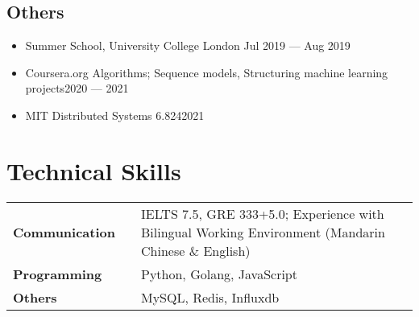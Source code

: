 \documentclass[a4,10pt]{article}
\newcommand{\subtext}[1]{
#1\par\vspace{-0.2cm}}
\newenvironment{zitemize}{
\begin{itemize}\itemsep0pt \parskip0pt \parsep1pt}
{\end{itemize}\vspace{-0.5cm}}
\newcommand{\hskills}[1]{
\textbf{\bfseries #1} }
\begin{document}
\subsection*{Others}
\begin{zitemize}
    \item
        \subtext{Summer School, University College London \hfill Jul 2019 --- Aug 2019}
        \vspace{0.1cm}
    \item
        \subtext{Coursera.org Algorithms; Sequence models, Structuring machine learning projects\hfill 2020 --- 2021 }
        \vspace{0.1cm}
    \item
        \subtext{MIT Distributed Systems 6.824\hfill2021}
        \vspace{0.1cm}
\end{zitemize}
\vspace{0.2cm}



\section{Technical Skills}
\begin{tabular}{p{11em} p{1em} p{43em}}
\hskills{Communication} & & IELTS 7.5, GRE 333+5.0; Experience with Bilingual Working Environment (Mandarin Chinese \& English)  \\
\hskills{Programming} &  & Python, Golang, JavaScript \\
\hskills{Others} & & MySQL, Redis, Influxdb
\end{tabular}
\vspace{-0.2cm}




\end{document}
